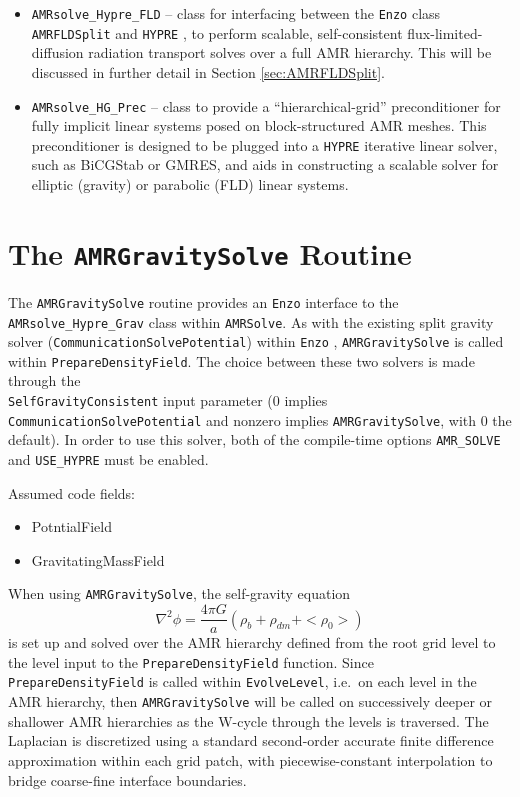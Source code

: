 \documentclass[letterpaper,10pt]{article}
\renewcommand{\(}{\left(}
\renewcommand{\)}{\right)}
\newcommand{\enzo}{{\tt Enzo} }
\newcommand{\hypre}{{\tt HYPRE} }
\begin{document}
\begin{itemize}
  \enzo routine {\tt AMRGravitySolve} and \hypre, to perform scalable,
  self-consistent self-gravity solves over a full AMR hierarchy.  This
  will be discussed in further detail in Section
  \ref{sec:AMRGravitySolve}.
\item {\tt AMRsolve\_Hypre\_FLD} -- class for interfacing between the
  \enzo class {\tt AMRFLDSplit} and \hypre, to perform scalable,
  self-consistent flux-limited-diffusion radiation transport solves
  over a full AMR hierarchy.  This will be discussed in further detail
  in Section \ref{sec:AMRFLDSplit}.
\item {\tt AMRsolve\_HG\_Prec} -- class to provide a
  ``hierarchical-grid'' preconditioner for fully implicit linear
  systems posed on block-structured AMR meshes.  This preconditioner
  is designed to be plugged into a \hypre iterative linear solver,
  such as BiCGStab or GMRES, and aids in constructing a scalable
  solver for elliptic (gravity) or parabolic (FLD) linear systems.
\end{itemize}



\section{The {\tt AMRGravitySolve} Routine}
\label{sec:AMRGravitySolve}

The {\tt AMRGravitySolve} routine provides an \enzo interface to the
{\tt AMRsolve\_Hypre\_Grav} class within {\tt AMRSolve}.  As with the
existing split gravity solver ({\tt CommunicationSolvePotential})
within \enzo, {\tt AMRGravitySolve} is called within 
{\tt PrepareDensityField}.  The choice between these two solvers is
made through the \\ 
{\tt SelfGravityConsistent} input parameter (0
implies {\tt CommunicationSolvePotential} and nonzero implies 
{\tt AMRGravitySolve}, with 0 the default).  In order to use this
solver, both of the compile-time options {\tt AMR\_SOLVE} and 
{\tt USE\_HYPRE} must be enabled.  

Assumed code fields:
\begin{itemize}
\item PotntialField
\item GravitatingMassField
\end{itemize}

When using {\tt AMRGravitySolve}, the self-gravity equation
\begin{equation}
\label{eq:self_gravity}
  \nabla^2 \phi = \frac{4\pi G}{a}(\rho_b + \rho_{dm} + <\!\!\rho_0\!\!>)
\end{equation}
is set up and solved over the AMR hierarchy defined from the root grid
level to the level input to the {\tt PrepareDensityField} function.
Since {\tt PrepareDensityField} is called within {\tt EvolveLevel},
i.e.~on each level in the AMR hierarchy, then {\tt AMRGravitySolve}
will be called on successively deeper or shallower AMR hierarchies as
the W-cycle through the levels is traversed.  The Laplacian is
discretized using a standard second-order accurate finite difference
approximation within each grid patch, with piecewise-constant
interpolation to bridge coarse-fine interface boundaries.
\end{document}

